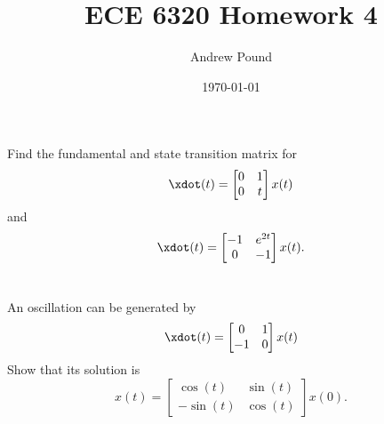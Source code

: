 \documentclass[10pt]{article}
\title{ECE 6320 Homework 4}
\author{Andrew Pound}
\date{\today}
\begin{document}
\maketitle



\section{}
Find the fundamental and state transition matrix for
\begin{equation}
  \xdot(t) =
  \begin{bmatrix}
   0 & 1 \\ 0 & t
  \end{bmatrix}x(t)
\end{equation}
and 
\begin{equation}
  \xdot(t) =
  \begin{bmatrix}
    -1 & e^{2t} \\ 0 & -1 
  \end{bmatrix}x(t).
\end{equation}


\section{}

An oscillation can be generated by 
\begin{equation}
  \xdot(t) =
  \begin{bmatrix}
    0 & 1 \\ -1 & 0
  \end{bmatrix}x(t)
\end{equation}
Show that its solution is 
\begin{equation}
  x(t) =
  \begin{bmatrix}
    \cos(t)& \sin(t) \\ -\sin(t) & \cos(t)
  \end{bmatrix}x(0).
\end{equation}
\end{document}
